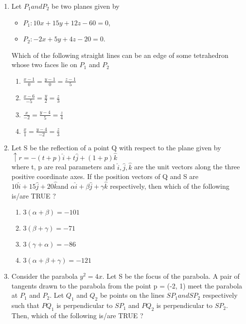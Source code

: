 \documentclass{article}
\begin{document}
\begin{enumerate}
	\item Let $P_1 and P_2$ be two planes given by\begin{itemize}                                         \item $P_1: 10x + 15y + 12z - 60 = 0$,

  \item $P_2 : -2x + 5y + 4z - 20 = 0$.
\end{itemize}
Which of the following straight lines can be an edge of some tetrahedron whose two faces lie on $P_1$
and $P_2$ 
\begin{enumerate}[label=\Alph*.]
	\item $\frac{x-1}{0} =\frac{y-1}{0} =\frac{z-1}{5}$ 
	\item $\frac{x-6}{-5} =\frac{y}{2} =\frac{z}{3}$
	\item $\frac{x}{-2} =\frac{y-4}{5} =\frac{z}{4}$
	\item $\frac{x}{1} =\frac{y-4}{-2} =\frac{z}{3}$
\end{enumerate}

  \item  Let S be the reflection of a point Q with respect to the plane given by\\
\qquad\qquad $\uparrow{r}=-(t+p)\hat{i}+t\hat{j}+(1+p)\hat{k}$\\
 where t, p are real parameters and $\hat{i}, \hat{j} ,\hat{k}$ are the unit vectors along the three positive coordinate 
axes. If the position vectors of Q and S are $10\hat{i}+ 15\hat{j}+ 20\hat{k} $and $\alpha\hat{i}+ \beta\hat{j}+ \gamma\hat{k}$ respectively, then which of the following is/are TRUE ?\\
\begin{enumerate}[label=\Alph*.]
    \item $3(\alpha + \beta) = -101$
    \item $3(\beta + \gamma) = -71$
    \item $3(\gamma + \alpha) = -86$
    \item $3(\alpha + \beta + \gamma) = -121$
\end{enumerate}


	\item Consider the parabola $y^2 = 4x$. Let S be the focus of the parabola. A pair of tangents drawn to the 
parabola from the point p = (-2, 1) meet the parabola at $P_1$ and $P_2$. Let $Q_1$ and $Q_2$ be points on the 
lines $SP_1 and SP_2$ respectively such that $PQ_1$ is perpendicular to $SP_1$ and $PQ_2$ is perpendicular to 
$SP_2$. Then, which of the following is/are TRUE ?


\end{enumerate}
\end{document}
